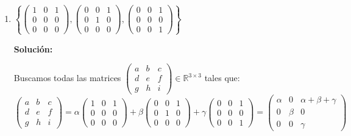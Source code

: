 \documentclass[12pt]{article}
\newcommand{\solucion}{%
    \vspace{0.8em}%
    \textbf{Solución:}%
    \vspace{0.8em}%
}
\begin{document}
\begin{enumerate}[label=\alph*.-]
    De la segunda igualdad se obtiene directamente la primera condición: $a_1=0$.

    Sustituyendo $\alpha=a_3$ y $\beta=a_2$ en la primera igualdad: $a_0=a_3+a_2$, es decir, $a_0-a_2-a_3=0$.

    \textbf{Conclusión:}
    \[
    \operatorname{gen}\{x^3+1,\; x^2+1\} = \{a_0+a_1x+a_2x^2+a_3x^3 \in \mathcal{P}_3 \; / \; a_1=0,\;\, a_0-a_2-a_3=0\}
    \]

    Es un subespacio de dimensión $2$ (tantos como parámetros libres, $\alpha$ y $\beta$).

    \item $\left\{ \begin{pmatrix} 1&0&1 \\ 0&0&0 \\ 0&0&0 \end{pmatrix}, \begin{pmatrix} 0&0&1 \\ 0&1&0 \\ 0&0&0 \end{pmatrix}, \begin{pmatrix} 0&0&1 \\ 0&0&0 \\ 0&0&1 \end{pmatrix} \right\}$

    \solucion

    Buscamos todas las matrices $\begin{pmatrix} a&b&c \\ d&e&f \\ g&h&i \end{pmatrix} \in \mathbb{R}^{3\times3}$ tales que:
    \[
    \begin{pmatrix} a&b&c \\ d&e&f \\ g&h&i \end{pmatrix}
    = \alpha\begin{pmatrix}1&0&1\\0&0&0\\0&0&0\end{pmatrix} + \beta\begin{pmatrix}0&0&1\\0&1&0\\0&0&0\end{pmatrix} + \gamma\begin{pmatrix}0&0&1\\0&0&0\\0&0&1\end{pmatrix}
    = \begin{pmatrix} \alpha & 0 & \alpha+\beta+\gamma \\ 0 & \beta & 0 \\ 0 & 0 & \gamma \end{pmatrix}
    \]


\end{enumerate}
\end{document}
